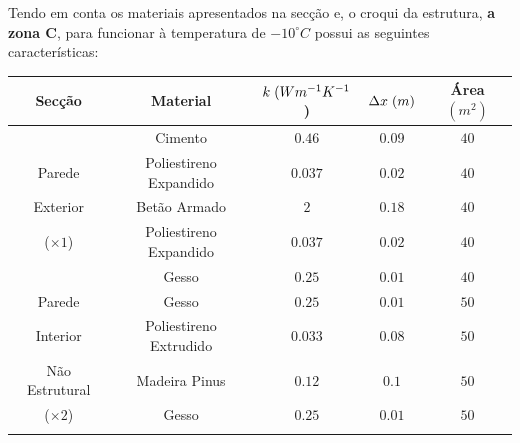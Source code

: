 \documentclass[12pt, a4paper]{article}
\begin{document}
Tendo em conta os materiais apresentados na secção e, o croqui da estrutura, \textbf{a zona C}, para funcionar
à temperatura de $ -10^\circ C $ possui as seguintes características:
\newpage
\begin{table}[htpb]
	\begin{center}
		\begin{tabular}{c c c c c}
			\toprule{}
			Secção                     & Material               & $ k \hspace{1mm} (Wm^{-1}K^{-1}$) & $ \Delta x \hspace{1mm} (m)$ & Área $(m^2) $ \\
				\midrule{}

			\multirow{5}{*}{}          & Cimento                & $0.46$                            & $0.09$                       & $40$          \\
				\cline{2-5}
			Parede                     & Poliestireno Expandido & $0.037$                           & $0.02$                       & $40$          \\
				\cline{2-5}
			Exterior                   & Betão Armado           & $2$                               & $0.18$                       & $40$          \\
				\cline{2-5}
			($\times 1$)               & Poliestireno Expandido & $0.037$                           & $0.02$                       & $40$          \\
				\cline{2-5}
			                           & Gesso                  & $0.25$                            & $0.01$                       & $40$          \\
				\midrule{}

			Parede \multirow{4}{*}{}   & Gesso                  & $0.25$                            & $0.01$                       & $50$          \\
				\cline{2-5}
			Interior                   & Poliestireno Extrudido & $0.033$                           & $0.08$                       & $50$          \\
				\cline{2-5}
			Não Estrutural             & Madeira Pinus          & $0.12$                            & $0.1$                        & $50$          \\
				\cline{2-5}
			($\times2$)                & Gesso                  & $0.25$                            & $0.01$                       & $50$          \\
				\midrule{}


\end{tabular}
\end{center}
\end{table}
\end{document}
